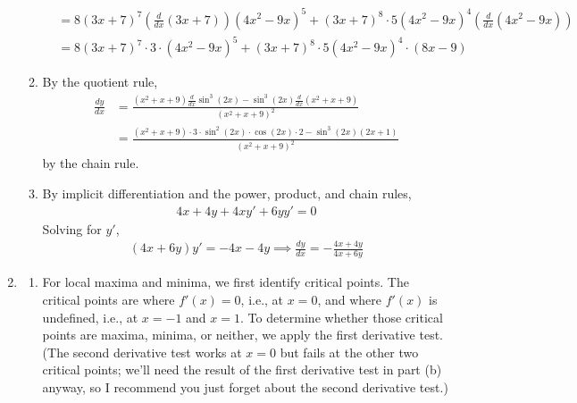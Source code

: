 \documentclass{article}
\newcommand{\ds}{\displaystyle}
\begin{document}
\begin{enumerate}
\begin{enumerate}
\begin{align*}
      &= 8(3x+7)^7 \left(\frac{d}{dx}(3x+7)\right) (4x^2-9x)^5
      + (3x+7)^8 \cdot 5 (4x^2-9x)^4 \left(\frac{d}{dx} (4x^2-9x) \right)
      \\
      &= 8(3x+7)^7 \cdot 3 \cdot (4x^2-9x)^5
      + (3x+7)^8 \cdot 5 (4x^2-9x)^4 \cdot (8x-9)
    \end{align*}
  \item By the quotient rule,
    \begin{align*}
      \frac{dy}{dx}
      &= \frac{\ds(x^2+x+9)\frac{d}{dx} \sin^3(2x) 
	- \sin^3(2x)\frac{d}{dx}(x^2+x+9)}{(x^2+x+9)^2}
      \\
      &= \frac{(x^2+x+9)\cdot 3\cdot \sin^2(2x)\cdot \cos(2x)\cdot 2
	- \sin^3(2x) (2x+1)}{(x^2+x+9)^2}
    \end{align*}
    by the chain rule.
  \item By implicit differentiation and the power, product, and chain rules,
    \begin{align*}
      4x + 4y + 4xy' + 6y y' = 0
    \end{align*}
    Solving for $y'$,
    \begin{align*}
      (4x+6y)y' = -4x-4y
      \implies
      \frac{dy}{dx} = -\frac{4x+4y}{4x+6y}
    \end{align*}
  \end{enumerate}
\item
  \begin{enumerate}
  \item For local maxima and minima, we first identify critical points.
    The critical points are where $f'(x)=0$, i.e., at $x=0$, and where
    $f'(x)$ is undefined, i.e., at $x=-1$ and $x=1$.  To determine whether
    those critical points are maxima, minima, or neither, we apply the 
    first derivative test.  (The second derivative test works at $x=0$ but
    fails at the other two critical points; we'll need the result of the
    first derivative test in part (b) anyway, so I recommend you just 
    forget about the second derivative test.)


\end{enumerate}
\end{enumerate}
\end{document}
